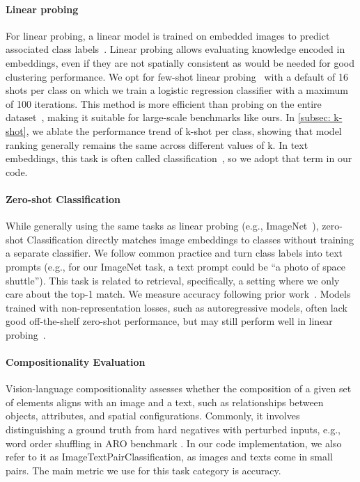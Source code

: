 \paragraph{Linear probing} For linear probing, a linear model is trained on embedded images to predict associated class labels~\citep{alain2018understandingintermediatelayersusing,radford2021learning}. Linear probing allows evaluating knowledge encoded in embeddings, even if they are not spatially consistent as would be needed for good clustering performance. We opt for few-shot linear probing~\citep{muennighoff2023mteb,cherti2023reproducible} with a default of 16 shots per class on which we train a logistic regression classifier with a maximum of 100 iterations. This method is more efficient than probing on the entire dataset~\citep{chen2021empirical,radford2021learning,oquab2024dinov2}, making it suitable for large-scale benchmarks like ours. In \autoref{subsec: k-shot}, we ablate the performance trend of k-shot per class, showing that model ranking generally remains the same across different values of k. In text embeddings, this task is often called classification~\citep{muennighoff2023mteb}, so we adopt that term in our code.

\paragraph{Zero-shot Classification} While generally using the same tasks as linear probing (e.g.,  ImageNet~\citep{deng2009imagenet}), zero-shot Classification directly matches image embeddings to classes without training a separate classifier. We follow common practice and turn class labels into text prompts (e.g., for our ImageNet task, a text prompt could be ``a photo of space shuttle''). This task is related to retrieval, specifically, a setting where we only care about the top-1 match. We measure accuracy following prior work~\citep{radford2021learning}. Models trained with non-representation losses, such as autoregressive models, often lack good off-the-shelf zero-shot performance, but may still perform well in linear probing~\citep{reimers2019sentence}.

\paragraph{Compositionality Evaluation} Vision-language compositionality assesses whether the composition of a given set of elements aligns with an image and a text, such as relationships between objects, attributes, and spatial configurations. Commonly, it involves distinguishing a ground truth from hard negatives with perturbed inputs, e.g., word order shuffling in ARO benchmark \cite{yuksekgonul2023aro}. In our code implementation, we also refer to it as ImageTextPairClassification, as images and texts come in small pairs. The main metric we use for this task category is accuracy.

